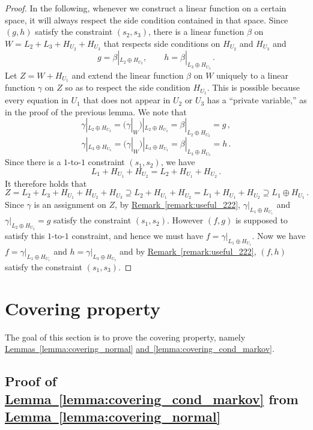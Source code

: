 \documentclass[11pt]{article}
\numberwithin{equation}{section}
\theoremstyle{definition}
\theoremstyle{plain}
\newcommand{\expref}[2]{\hyperref[#2]{#1~\ref{#2}}}
\newcommand*\xor{\mathbin{\oplus}}
\begin{document}
\begin{proof} In the following, whenever we construct a linear function on a certain space, it will always respect the side condition contained in that
space. Since $(g,h)$ satisfy the constraint $(s_2, s_3)$, there is a linear function $\beta$ on $W = L_2 + L_3 + H_{U_2} + H_{U_3}$ that respects
side conditions on $H_{U_2}$ and $H_{U_3}$ and
  $$g = \beta|_{L_2 \xor H_{U_2}},  \quad \quad h = \beta|_{L_3 \xor H_{U_3}}\,.$$%
Let $Z = W + H_{U_1}$ and extend the linear function $\beta$ on $W$ uniquely to a linear function $\gamma$ on $Z$ so as to respect the side condition $H_{U_1}$.  This is possible because
every equation in $U_1$ that does not appear in $U_2$ or
$U_3$ has a ``private variable,'' as in the proof of the previous lemma. We note that
 $$\gamma|_{L_2 \xor H_{U_2}} = (\gamma|_W)|_{L_2 \xor H_{U_2}} = \beta|_{L_2 \xor H_{U_2}} = g\,,$$%
  $$\gamma|_{L_3 \xor H_{U_3}} = (\gamma|_W)|_{L_3 \xor H_{U_3}} = \beta|_{L_3 \xor H_{U_3}} = h\,.$$%
Since there is a $1$-to-$1$ constraint $(s_1, s_2)$, we have
  $$L_1 +  H_{U_1} + H_{U_2} =  L_2 + H_{U_1} + H_{U_2}\,.$$%
It therefore holds  that
 $$ Z =  L_2 + L_3 + H_{U_1} + H_{U_2} + H_{U_3}  \supseteq L_2 + H_{U_1} + H_{U_2} = L_1 + H_{U_1} + H_{U_2} \supseteq L_1 \xor H_{U_1}\,.$$%
Since $\gamma$ is an assignment on $Z$, by \expref{Remark}{remark:useful_222}, $\gamma|_{L_1 \xor H_{U_1}}$ and $\gamma|_{L_2 \xor H_{U_2}} = g$
satisfy the constraint $(s_1, s_2)$. However $(f,g)$ is supposed to satisfy this $1$-to-$1$ constraint, and hence we must have $f = \gamma|_{L_1 \xor H_{U_1}}$.
Now we have
  $f = \gamma|_{L_1 \xor H_{U_1}}$ and $h = \gamma|_{L_3 \xor H_{U_3}}$ and by \expref{Remark}{remark:useful_222}, $(f,h)$ satisfy the constraint $(s_1, s_3)$.
\end{proof}

\section{Covering property}\label{appendix:covering}
The goal of this section is to prove the covering property, namely
\expref{Lemmas}{lemma:covering_normal} \expref{and}{lemma:covering_cond_markov}.
\subsection*{Proof of \expref{Lemma}{lemma:covering_cond_markov} from \expref{Lemma}{lemma:covering_normal}}
\end{document}
